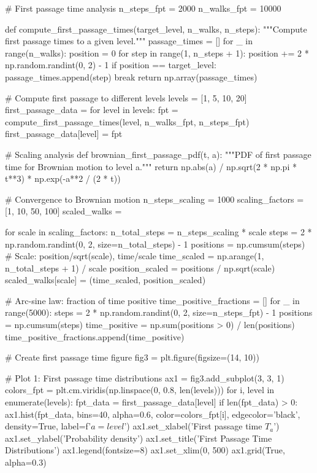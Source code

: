 \documentclass[a4paper, 11pt]{article}
\begin{document}
\begin{pycode}
# First passage time analysis
n_steps_fpt = 2000
n_walks_fpt = 10000

def compute_first_passage_times(target_level, n_walks, n_steps):
    """Compute first passage times to a given level."""
    passage_times = []
    for _ in range(n_walks):
        position = 0
        for step in range(1, n_steps + 1):
            position += 2 * np.random.randint(0, 2) - 1
            if position == target_level:
                passage_times.append(step)
                break
    return np.array(passage_times)

# Compute first passage to different levels
levels = [1, 5, 10, 20]
first_passage_data = {}
for level in levels:
    fpt = compute_first_passage_times(level, n_walks_fpt, n_steps_fpt)
    first_passage_data[level] = fpt

# Scaling analysis
def brownian_first_passage_pdf(t, a):
    """PDF of first passage time for Brownian motion to level a."""
    return np.abs(a) / np.sqrt(2 * np.pi * t**3) * np.exp(-a**2 / (2 * t))

# Convergence to Brownian motion
n_steps_scaling = 1000
scaling_factors = [1, 10, 50, 100]
scaled_walks = {}

for scale in scaling_factors:
    n_total_steps = n_steps_scaling * scale
    steps = 2 * np.random.randint(0, 2, size=n_total_steps) - 1
    positions = np.cumsum(steps)
    # Scale: position/sqrt(scale), time/scale
    time_scaled = np.arange(1, n_total_steps + 1) / scale
    position_scaled = positions / np.sqrt(scale)
    scaled_walks[scale] = (time_scaled, position_scaled)

# Arc-sine law: fraction of time positive
time_positive_fractions = []
for _ in range(5000):
    steps = 2 * np.random.randint(0, 2, size=n_steps_fpt) - 1
    positions = np.cumsum(steps)
    time_positive = np.sum(positions > 0) / len(positions)
    time_positive_fractions.append(time_positive)

# Create first passage time figure
fig3 = plt.figure(figsize=(14, 10))

# Plot 1: First passage time distributions
ax1 = fig3.add_subplot(3, 3, 1)
colors_fpt = plt.cm.viridis(np.linspace(0, 0.8, len(levels)))
for i, level in enumerate(levels):
    fpt_data = first_passage_data[level]
    if len(fpt_data) > 0:
        ax1.hist(fpt_data, bins=40, alpha=0.6, color=colors_fpt[i],
                 edgecolor='black', density=True, label=f'$a={level}$')
ax1.set_xlabel('First passage time $T_a$')
ax1.set_ylabel('Probability density')
ax1.set_title('First Passage Time Distributions')
ax1.legend(fontsize=8)
ax1.set_xlim(0, 500)
ax1.grid(True, alpha=0.3)


\end{pycode}
\end{document}
